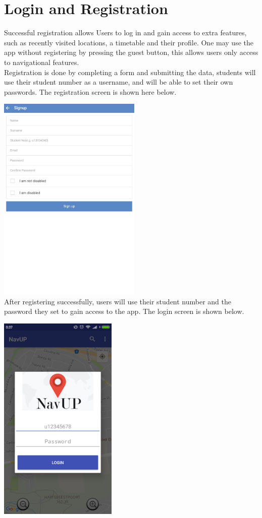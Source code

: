 \documentclass{article}
\begin{document}
\newpage
\section{Login and Registration}
	Successful registration allows Users to log in and gain access to extra features, such as recently visited locations, a timetable and their profile. One may use the app without registering by pressing the guest button, this allows users only access to navigational features.
	\\
	Registration is done by completing a form and submitting the data, students will use their student number as a username, and will be able to set their own passwords. The registration screen is shown here below.
	\\
	\par
	\includegraphics[height=10cm]{register.png}
	\\
	After registering successfully, users will use their student number and the password they set to gain access to the app. The login screen is shown below.
	\\
	\par
	\includegraphics[height=10cm]{login.png}
\end{document}
